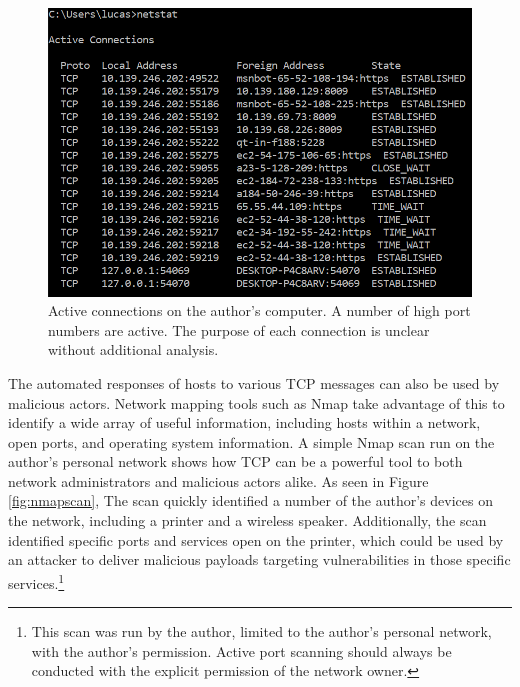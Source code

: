 \documentclass[10pt]{IEEEtran}
\begin{document}
   \begin{figure}[h!]
	\includegraphics[width=\linewidth]{netstat.png}
	\caption{Active connections on the author's computer. A number of high port numbers are active. The purpose of each connection is unclear without additional analysis.}
	\label{fig:netstat}
\end{figure}

 The automated responses of hosts to various TCP messages can also be used by malicious actors. Network mapping tools such as Nmap take advantage of this to identify a wide array of useful information, including hosts within a network, open ports, and operating system information. A simple Nmap scan run on the author's personal network shows how TCP can be a powerful tool to both network administrators and malicious actors alike. As seen in Figure \ref{fig:nmapscan}, The scan quickly identified a number of the author's devices on the network, including a printer and a wireless speaker. Additionally, the scan identified specific ports and services open on the printer, which could be used by an attacker to deliver malicious payloads targeting vulnerabilities in those specific services.\footnote{This scan was run by the author, limited to the author's personal network, with the author's permission. Active port scanning should always be conducted with the explicit permission of the network owner.}
 
\end{document}
